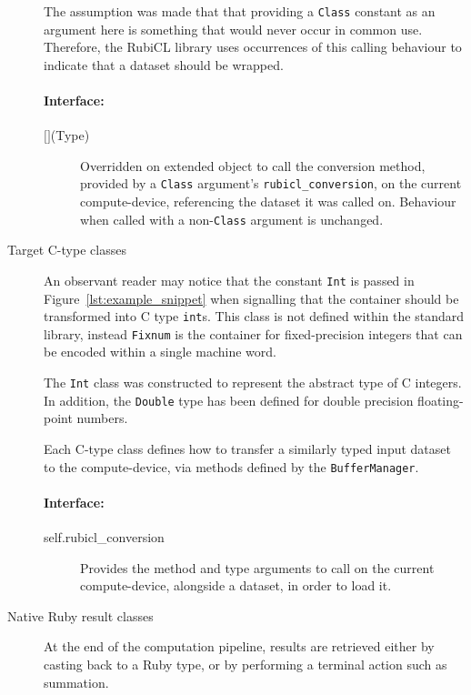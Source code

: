 \begin{description}
The assumption was made that that providing a \verb|Class| constant as an argument here is something that would never occur in common use. Therefore, the RubiCL library uses occurrences of this calling behaviour to indicate that a dataset should be wrapped.

\paragraph*{Interface:}
\begin{description}
  \item[$\lbrack\rbrack$(Type)] Overridden on extended object to call the conversion method, provided by a \verb|Class| argument's \verb|rubicl_conversion|, on the current compute-device, referencing the dataset it was called on. Behaviour when called with a non-\verb|Class| argument is unchanged.
\end{description}

  \item[Target C-type classes]
An observant reader may notice that the constant \verb|Int| is passed in Figure~\ref{lst:example_snippet} when signalling that the container should be transformed into C type \verb|int|s. This class is not defined within the standard library, instead \verb|Fixnum| is the container for fixed-precision integers that can be encoded within a single machine word.

The \verb|Int| class was constructed to represent the abstract type of C integers. In addition, the \verb|Double| type has been defined for double precision floating-point numbers.

Each C-type class defines how to transfer a similarly typed input dataset to the compute-device, via methods defined by the \verb|BufferManager|.

\paragraph*{Interface:}
\begin{description}
  \item[self.rubicl\_conversion] Provides the method and type arguments to call on the current compute-device, alongside a dataset, in order to load it.
\end{description}

\item[Native Ruby result classes]
At the end of the computation pipeline, results are retrieved either by casting back to a Ruby type, or by performing a terminal action such as summation.


\end{description}
